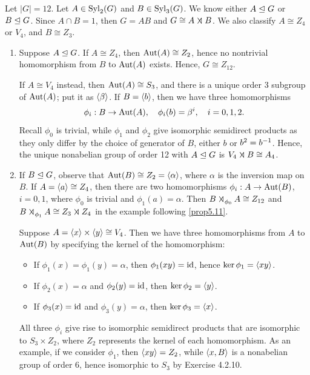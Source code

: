 \ex Let $|G| = 12$. Let $A \in \operatorname{Syl}_2(G)$ and $B \in \operatorname{Syl}_3(G)$. We know either $A \trianglelefteq G$ or $B \trianglelefteq G$. Since $A \cap B = 1$, then $G = AB$ and $G \cong A \semidir B$. We also classify $A \cong Z_4$ or $V_4$, and $B \cong Z_3$.
\begin{enumerate}
    \item Suppose $A \trianglelefteq G$. If $A \cong Z_4$, then $\operatorname{Aut}(A) \cong Z_2$, hence no nontrivial homomorphism from $B$ to $\operatorname{Aut}(A)$ exists. Hence, $G \cong Z_{12}$.
    
    If $A \cong V_4$ instead, then $\operatorname{Aut}(A) \cong S_3$, and there is a unique order 3 subgroup of $\operatorname{Aut}(A)$; put it as $\langle\beta\rangle$. If $B = \langle b\rangle$, then we have three homomorphisms
    \[\phi_i : B \to \operatorname{Aut}(A), \quad \phi_i(b) = \beta^i, \quad i = 0, 1, 2.\]
    Recall $\phi_0$ is trivial, while $\phi_1$ and $\phi_2$ give isomorphic semidirect products as they only differ by the choice of generator of $B$, either $b$ or $b^2 = b^{-1}$. Hence, the unique nonabelian group of order 12 with $A \trianglelefteq G$ is $V_4 \semidir B \cong A_4$.
    \item If $B \trianglelefteq G$, observe that $\operatorname{Aut}(B) \cong Z_2 = \langle\alpha\rangle$, where $\alpha$ is the inversion map on $B$. If $A = \langle a\rangle \cong Z_4$, then there are two homomorphisms $\phi_i : A \to \operatorname{Aut}(B)$, $i = 0, 1$, where $\phi_0$ is trivial and $\phi_1(a) = \alpha$. Then $B \semidir_{\phi_0} A \cong Z_{12}$ and $B \semidir_{\phi_1} A \cong Z_3 \semidir Z_4$ in the example following \autoref{prop5.11}.
    
    Suppose $A = \langle x\rangle \times \langle y\rangle \cong V_4$. Then we have three homomorphisms from $A$ to $\operatorname{Aut}(B)$ by specifying the kernel of the homomorphism:
    \begin{itemize}
        \item If $\phi_1(x) = \phi_1(y) = \alpha$, then $\phi_1(xy) = \operatorname{id}$, hence $\ker\phi_1 = \langle xy\rangle$.
        \item If $\phi_2(x) = \alpha$ and $\phi_2(y) = \operatorname{id}$, then $\ker\phi_2 = \langle y\rangle$.
        \item If $\phi_3(x) = \operatorname{id}$ and $\phi_3(y) = \alpha$, then $\ker\phi_3 = \langle x\rangle$.
    \end{itemize}
    All three $\phi_i$ give rise to isomorphic semidirect products that are isomorphic to $S_3 \times Z_2$, where $Z_2$ represents the kernel of each homomorphism. As an example, if we consider $\phi_1$, then $\langle xy\rangle = Z_2$, while $\langle x, B\rangle$ is a nonabelian group of order 6, hence isomorphic to $S_3$ by Exercise 4.2.10.
\end{enumerate}

